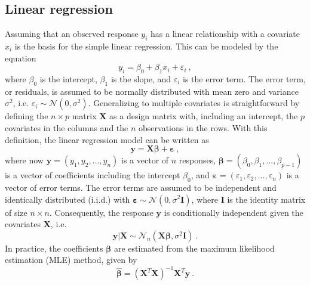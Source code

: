\subsection{Linear regression}
Assuming that an observed response $y_i$ has a linear relationship with a covariate $x_i$ is the basis for the simple linear regression.
This can be modeled by the equation
\begin{equation}
    y_i = \beta_0 + \beta_1x_i + \varepsilon_i \ ,
\end{equation}
where $\beta_0$ is the intercept, $\beta_1$ is the slope, and $\varepsilon_i$ is the error term.
The error term, or residuals, is assumed to be normally distributed with mean zero and variance $\sigma^2$, i.e. $\varepsilon_i \sim \mathcal{N}(0, \sigma^2)$.
Generalizing to multiple covariates is straightforward by defining the $n\times p$ matrix $\mathbf{X}$ as a design matrix with, including an intercept, the $p$ covariates in the columns and the $n$ observations in the rows.
With this definition, the linear regression model can be written as
\begin{equation}
    \label{eq:linreg}
    \mathbf{y} = \mathbf{X}\boldsymbol{\beta} + \mathbf{\varepsilon} \ ,
\end{equation}
where now $\mathbf{y}=(y_1, y_2, ..., y_n)$ is a vector of $n$ responses, $\boldsymbol{\beta}=(\beta_0, \beta_1, ..., \beta_{p-1})$ is a vector of coefficients including the intercept $\beta_0$, and $\mathbf{\varepsilon}=(\varepsilon_1, \varepsilon_2, ..., \varepsilon_n)$ is a vector of error terms.
The error terms are assumed to be independent and identically distributed (i.i.d.) with $\boldsymbol{\varepsilon} \sim \mathcal{N}(0, \sigma^2 \mathbf{I})$, where $\mathbf{I}$ is the identity matrix of size $n \times n$.
Consequently, the response $\mathbf{y}$ is conditionally independent given the covariates $\mathbf{X}$, i.e.
\begin{equation}
    \mathbf{y} \lvert \mathbf{X} \sim \mathcal{N}_n(\mathbf{X}\boldsymbol{\beta}, \sigma^2\mathbf{I}) \ .
\end{equation}
In practice, the coefficients $\boldsymbol{\beta}$ are estimated from the maximum likelihood estimation (MLE) method, given by
\begin{equation}
    \label{eq:beta_hat}
    \hat{\boldsymbol{\beta}} = (\mathbf{X}^T\mathbf{X})^{-1}\mathbf{X}^T\mathbf{y} \ .
\end{equation}

